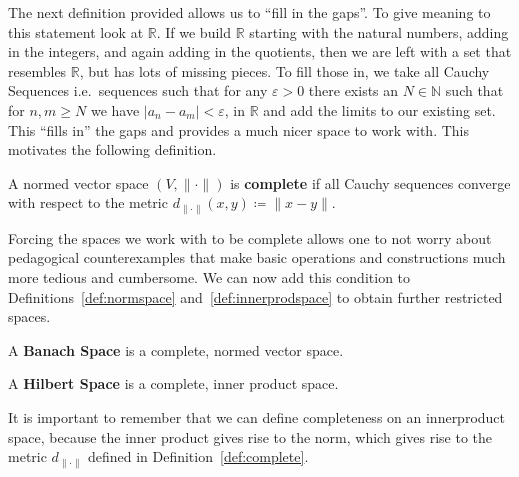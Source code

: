 The next definition provided allows us to ``fill in the gaps''. To give meaning
to this statement look at \(\mathbb{R}\). If we build \(\mathbb{R}\) starting
with the natural numbers, adding in the integers, and again adding in the
quotients, then we are left with a set that resembles \(\mathbb{R}\), but has
lots of missing pieces. To fill those in, we take all Cauchy Sequences
i.e.\ sequences such that for any \(\varepsilon >0\) there exists an
\(N\in\mathbb{N}\) such that for \(n,m\geq N\) we have
\(|a_n - a_m| < \varepsilon\), in \(\mathbb{R}\) and add the limits to our
existing set. This ``fills in'' the gaps and provides a much nicer space to work
with. This motivates the following definition.
\begin{definition}\label{def:complete}
    A normed vector space \((V, \|\cdot\|)\) is \textbf{complete} if all Cauchy
    sequences converge with respect to the metric
    \(d_{\|\cdot\|}(x,y)\coloneqq\|x - y\|\).
\end{definition}
Forcing the spaces we work with to be complete allows one to not worry about
pedagogical counterexamples that make basic operations and constructions much
more tedious and cumbersome. We can now add this condition to
Definitions~\ref{def:normspace} and~\ref{def:innerprodspace} to obtain further
restricted spaces.
\begin{definition}\label{def:banach}
    A \textbf{Banach Space} is a complete, normed vector space.
\end{definition}
\begin{definition}
    A \textbf{Hilbert Space} is a complete, inner product space.
\end{definition}
It is important to remember that we can define completeness on an innerproduct
space, because the inner product gives rise to the norm, which gives rise to the
metric \(d_{\|\cdot\|}\) defined in Definition~\ref{def:complete}.


